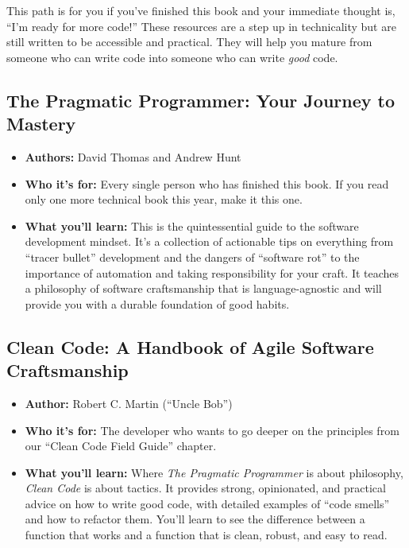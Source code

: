 \documentclass[
  letterpaper,
  DIV=11,
  numbers=noendperiod]{scrreprt}
\providecommand{\tightlist}{%
  \setlength{\itemsep}{0pt}\setlength{\parskip}{0pt}}
\begin{document}
This path is for you if you've finished this book and your immediate
thought is, ``I'm ready for more code!'' These resources are a step up
in technicality but are still written to be accessible and practical.
They will help you mature from someone who can write code into someone
who can write \emph{good} code.

\subsection{\texorpdfstring{\textbf{The Pragmatic Programmer: Your
Journey to
Mastery}}{The Pragmatic Programmer: Your Journey to Mastery}}\label{the-pragmatic-programmer-your-journey-to-mastery}

\begin{itemize}
\tightlist
\item
  \textbf{Authors:} David Thomas and Andrew Hunt
\item
  \textbf{Who it's for:} Every single person who has finished this book.
  If you read only one more technical book this year, make it this one.
\item
  \textbf{What you'll learn:} This is the quintessential guide to the
  software development mindset. It's a collection of actionable tips on
  everything from ``tracer bullet'' development and the dangers of
  ``software rot'' to the importance of automation and taking
  responsibility for your craft. It teaches a philosophy of software
  craftsmanship that is language-agnostic and will provide you with a
  durable foundation of good habits.
\end{itemize}

\subsection{\texorpdfstring{\textbf{Clean Code: A Handbook of Agile
Software
Craftsmanship}}{Clean Code: A Handbook of Agile Software Craftsmanship}}\label{clean-code-a-handbook-of-agile-software-craftsmanship}

\begin{itemize}
\tightlist
\item
  \textbf{Author:} Robert C. Martin (``Uncle Bob'')
\item
  \textbf{Who it's for:} The developer who wants to go deeper on the
  principles from our ``Clean Code Field Guide'' chapter.
\item
  \textbf{What you'll learn:} Where \emph{The Pragmatic Programmer} is
  about philosophy, \emph{Clean Code} is about tactics. It provides
  strong, opinionated, and practical advice on how to write good code,
  with detailed examples of ``code smells'' and how to refactor them.
  You'll learn to see the difference between a function that works and a
  function that is clean, robust, and easy to read.
\end{itemize}
\end{document}
